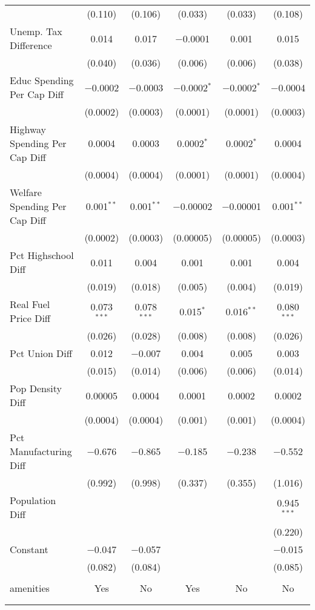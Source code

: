 \begin{table}[!htbp]
\begin{tabular}{@{\extracolsep{5pt}}lccccc}
  & (0.110) & (0.106) & (0.033) & (0.033) & (0.108) \\ 
  Unemp. Tax Difference & 0.014 & 0.017 & $-$0.0001 & 0.001 & 0.015 \\ 
  & (0.040) & (0.036) & (0.006) & (0.006) & (0.038) \\ 
  Educ Spending Per Cap Diff & $-$0.0002 & $-$0.0003 & $-$0.0002$^{*}$ & $-$0.0002$^{*}$ & $-$0.0004 \\ 
  & (0.0002) & (0.0003) & (0.0001) & (0.0001) & (0.0003) \\ 
  Highway Spending Per Cap Diff & 0.0004 & 0.0003 & 0.0002$^{*}$ & 0.0002$^{*}$ & 0.0004 \\ 
  & (0.0004) & (0.0004) & (0.0001) & (0.0001) & (0.0004) \\ 
  Welfare Spending Per Cap Diff & 0.001$^{**}$ & 0.001$^{**}$ & $-$0.00002 & $-$0.00001 & 0.001$^{**}$ \\ 
  & (0.0002) & (0.0003) & (0.00005) & (0.00005) & (0.0003) \\ 
  Pct Highschool Diff & 0.011 & 0.004 & 0.001 & 0.001 & 0.004 \\ 
  & (0.019) & (0.018) & (0.005) & (0.004) & (0.019) \\ 
  Real Fuel Price Diff & 0.073$^{***}$ & 0.078$^{***}$ & 0.015$^{*}$ & 0.016$^{**}$ & 0.080$^{***}$ \\ 
  & (0.026) & (0.028) & (0.008) & (0.008) & (0.026) \\ 
  Pct Union Diff & 0.012 & $-$0.007 & 0.004 & 0.005 & 0.003 \\ 
  & (0.015) & (0.014) & (0.006) & (0.006) & (0.014) \\ 
  Pop Density Diff & 0.00005 & 0.0004 & 0.0001 & 0.0002 & 0.0002 \\ 
  & (0.0004) & (0.0004) & (0.001) & (0.001) & (0.0004) \\ 
  Pct Manufacturing Diff & $-$0.676 & $-$0.865 & $-$0.185 & $-$0.238 & $-$0.552 \\ 
  & (0.992) & (0.998) & (0.337) & (0.355) & (1.016) \\ 
  Population Diff &  &  &  &  & 0.945$^{***}$ \\ 
  &  &  &  &  & (0.220) \\ 
  Constant & $-$0.047 & $-$0.057 &  &  & $-$0.015 \\ 
  & (0.082) & (0.084) &  &  & (0.085) \\ 
 \hline \\[-1.8ex] 
amenities & Yes & No & Yes & No & No \\ 
\hline \\[-1.8ex] 
\hline 
\hline \\[-1.8ex] 
\end{tabular} 
\end{table} 
